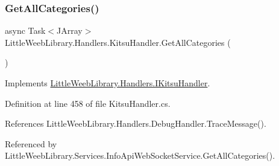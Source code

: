 \mbox{\label{class_little_weeb_library_1_1_handlers_1_1_kitsu_handler_ae329f7e735a6abee2734bbbd13d121b2}} 
\subsubsection{\texorpdfstring{Get\+All\+Categories()}{GetAllCategories()}}
{\footnotesize\ttfamily async Task$<$J\+Array$>$ Little\+Weeb\+Library.\+Handlers.\+Kitsu\+Handler.\+Get\+All\+Categories (\begin{DoxyParamCaption}{ }\end{DoxyParamCaption})}



Implements \mbox{\hyperlink{interface_little_weeb_library_1_1_handlers_1_1_i_kitsu_handler_aac2bc10e35e89c47fe6b9954dd86442a}{Little\+Weeb\+Library.\+Handlers.\+I\+Kitsu\+Handler}}.



Definition at line 458 of file Kitsu\+Handler.\+cs.



References Little\+Weeb\+Library.\+Handlers.\+Debug\+Handler.\+Trace\+Message().



Referenced by Little\+Weeb\+Library.\+Services.\+Info\+Api\+Web\+Socket\+Service.\+Get\+All\+Categories().


